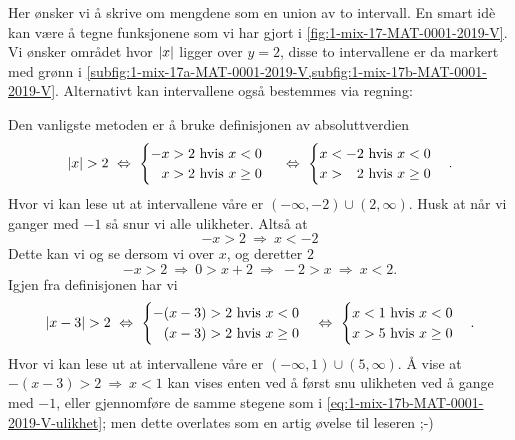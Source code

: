 \documentclass[a4paper,11pt]{article}
\begin{document}
\begin{solution}
  Her ønsker vi å skrive om mengdene som en union av to intervall.  En smart idè
  kan være å tegne funksjonene som vi har gjort i
  \cref{fig:1-mix-17-MAT-0001-2019-V}. Vi ønsker området hvor $\lvert x\rvert$ ligger
  over $y = 2$, disse to intervallene er da markert med grønn i
  \cref{subfig:1-mix-17a-MAT-0001-2019-V,subfig:1-mix-17b-MAT-0001-2019-V}.
  Alternativt kan intervallene også bestemmes via regning: \medskip

   Den vanligste metoden er
  å bruke definisjonen av absoluttverdien
  \begin{equation*}
    \abs{x} > 2
    \ \Leftrightarrow \ 
    \begin{cases}
      -  x > 2 \ \text{hvis} \ x < 0 \\
      \phantom{-} x > 2 \ \text{hvis} \ x \geq 0
    \end{cases}
    \ \Leftrightarrow \ 
    \begin{cases}
      x < - 2 \ \text{hvis} \ x < 0 \\
      x > \phantom{-} 2 \ \text{hvis} \ x \geq 0
    \end{cases}.
  \end{equation*}
  Hvor vi kan lese ut at intervallene våre er $(-\infty,-2) \cup (2,\infty)$.
  Husk at når vi ganger med $-1$ så snur vi alle ulikheter.  Altså at 
  \begin{equation*}
    -x > 2 \ \Rightarrow \ x < -2
  \end{equation*}
  Dette kan vi og se dersom vi 
  over $x$, og deretter $2$
  \begin{equation}
    \label{eq:1-mix-17b-MAT-0001-2019-V-ulikhet}
    -x > 2 
    \ \Rightarrow \  0 > x + 2 
    \ \Rightarrow \ -2 > x 
    \ \Rightarrow \  x < 2.
  \end{equation}
   Igjen fra definisjonen
  har vi
  \begin{equation*}
    \abs{x-3} > 2
    \ \Leftrightarrow \ 
    \begin{cases}
      -(x-3) > 2 \ \text{hvis} \ x < 0 \\
      \phantom{-}(x-3) > 2 \ \text{hvis} \ x \geq 0
    \end{cases}
    \Leftrightarrow \ 
    \begin{cases}
      x < 1\ \text{hvis} \ x < 0 \\
      x > 5 \ \text{hvis} \ x \geq 0
    \end{cases}.
  \end{equation*}
  Hvor vi kan lese ut at intervallene våre er $(-\infty,1)\cup(5,\infty)$.  Å
  vise at $-(x-3) > 2 \ \Rightarrow \ x < 1$ kan vises enten ved å først snu
  ulikheten ved å gange med $-1$, eller gjennomføre de samme stegene som i
  \cref{eq:1-mix-17b-MAT-0001-2019-V-ulikhet}; men dette overlates som en artig
  øvelse til leseren ;-)
\end{solution}
\end{document}
